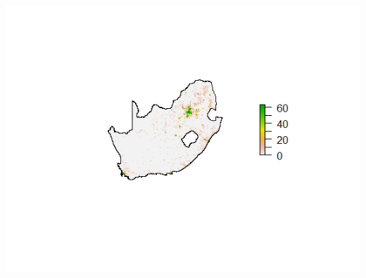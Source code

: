 \documentclass[11pt,preprint, authoryear]{elsarticle}
\let\origfigure\figure
\let\endorigfigure\endfigure
\renewenvironment{figure}[1][2] {
    \expandafter\origfigure\expandafter[H]
} {
    \endorigfigure
}
\numberwithin{equation}{section}
\numberwithin{figure}{section}
\numberwithin{table}{section}
\begin{document}
\begin{figure}[H]
\includegraphics[width=1\linewidth]{figures/finalf15} \caption{\label{finalf152001} Final Local Human Lights Image for the F15 satellite for 2001}\label{fig:finalf152001}
\end{figure}


\end{document}
